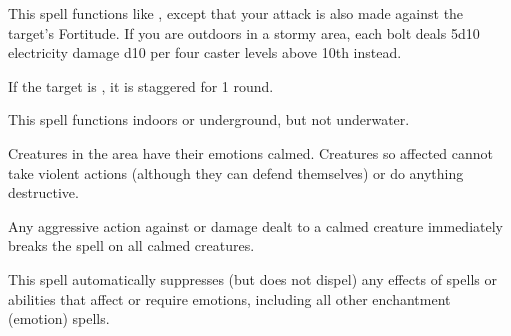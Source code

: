 \begin{spelleffect}
    This spell functions like , except that your attack is also made against the target's Fortitude. If you are outdoors in a stormy area, each bolt deals 5d10 electricity damage \add d10 per four caster levels above 10th instead.
\end{spelleffect}
\begin{spellsuccess}
    If the target is \bloodied, it is staggered for 1 round.
\end{spellsuccess}
\begin{spellnotes}
    This spell functions indoors or underground, but not underwater. \destructivespellnotes
\end{spellnotes}

\spellrng{\rngmed}
\begin{spellsuccess}
  Creatures in the area have their emotions calmed. Creatures so affected cannot take violent actions (although they can defend themselves) or do anything destructive.
\end{spellsuccess}
\begin{spellnotes}
  Any aggressive action against or damage dealt to a calmed creature immediately breaks the spell on all calmed creatures.

  This spell automatically suppresses (but does not dispel) any effects of spells or abilities that affect or require emotions, including all other enchantment (emotion) spells.
\end{spellnotes}

